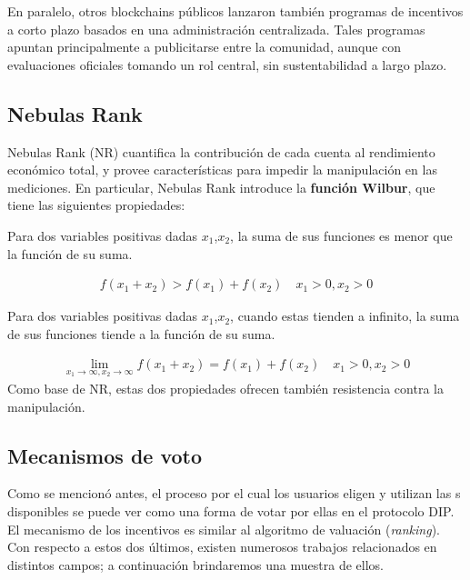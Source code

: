 En paralelo, otros blockchains públicos lanzaron también programas de incentivos a corto plazo basados en una administración centralizada. Tales programas apuntan principalmente a publicitarse entre la comunidad, aunque con evaluaciones oficiales tomando un rol central, sin sustentabilidad a largo plazo.


\subsection{Nebulas Rank}
\noindent
Nebulas Rank (NR)\cite{Nebulasyellowpaper} cuantifica la contribución de cada cuenta al rendimiento económico total, y provee características para impedir la manipulación en las mediciones. En particular, Nebulas Rank introduce la \textbf{función Wilbur}, que tiene las siguientes propiedades:

\begin{property}
	\label{prop:one}
	Para dos variables positivas dadas $x_1$,$x_2$, la suma de sus funciones es menor que la función de su suma.
\end{property}
\begin{align}
	f(x_1+x_2)>f(x_1)+f(x_2) \quad x_1>0,x_2>0
\end{align}
\begin{property}
	\label{prop:two}
	Para dos variables positivas dadas $x_1$,$x_2$, cuando estas tienden a infinito, la suma de sus funciones tiende a la función de su suma.
\end{property}

\begin{align}
	\lim\limits_{x_1 \to \infty, x_2\to \infty} f(x_1+x_2) = f(x_1) + f(x_2)\quad x_1>0, x_2>0
\end{align}
\noindent Como base de NR, estas dos propiedades ofrecen también resistencia contra la manipulación.

\subsection{Mecanismos de voto}
\noindent
Como se mencionó antes, el proceso por el cual los usuarios eligen y utilizan las {\dapp}s disponibles se puede ver como una forma de votar por ellas en el protocolo DIP. El mecanismo de los incentivos es similar al algoritmo de valuación (\textit{ranking}). Con respecto a estos dos últimos, existen numerosos trabajos relacionados en distintos campos; a continuación brindaremos una muestra de ellos.

